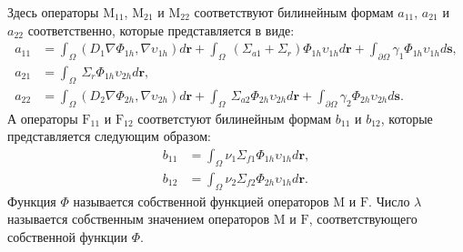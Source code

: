 Здесь операторы  $\mathrm{M}_{11}$, $\mathrm{M}_{21}$ и $\mathrm{M}_{22}$ соответствуют билинейным формам $a_{11}$, $a_{21}$ и $a_{22}$ соответственно, которые представляется в виде:
\[
\begin{split}
a_{11} &= \int_\Omega (D_1 \nabla \Phi_{1h}, \nabla \upsilon_{1h} ) d\bm{r} + \int_\Omega\ (\Sigma_{a1} + \Sigma_r)\Phi_{1h} \upsilon_{1h} d\bm{r} + \int_{\partial \Omega} \gamma_1 \Phi_{1h} \upsilon_{1h} d\bm{s},\\
a_{21} &= \int_\Omega\ \Sigma_r \Phi_{1h} \upsilon_{2h} d\bm{r},\\
a_{22} &= \int_\Omega (D_2 \nabla \Phi_{2h}, \nabla \upsilon_{2h} ) d\bm{r} + \int_\Omega\ \Sigma_{a2} \Phi_{2h} \upsilon_{2h} d\bm{r} + \int_{\partial \Omega} \gamma_2 \Phi_{2h} \upsilon_{2h} d\bm{s}.
\end{split}
\]
А операторы $\mathrm{F}_{11}$ и $\mathrm{F}_{12}$ соответстуют билинейным формам $b_{11}$ и $b_{12}$, которые представляется следующим образом:
\[
\begin{split}
b_{11} &= \int_\Omega \nu_1 \Sigma_{f1} \Phi_{1h} \upsilon_{1h} d\bm{r},
\\
b_{12} &= \int_\Omega \nu_2 \Sigma_{f2} \Phi_{2h} \upsilon_{1h} d\bm{r}. 
\end{split}
\]
Функция $\Phi$ называется собственной функцией операторов $\mathrm{M}$ и $\mathrm{F}$. Число $\lambda$ называется собственным значением операторов $\mathrm{M}$ и $\mathrm{F}$, соответствующего собственной функции $\Phi$.
%
%
